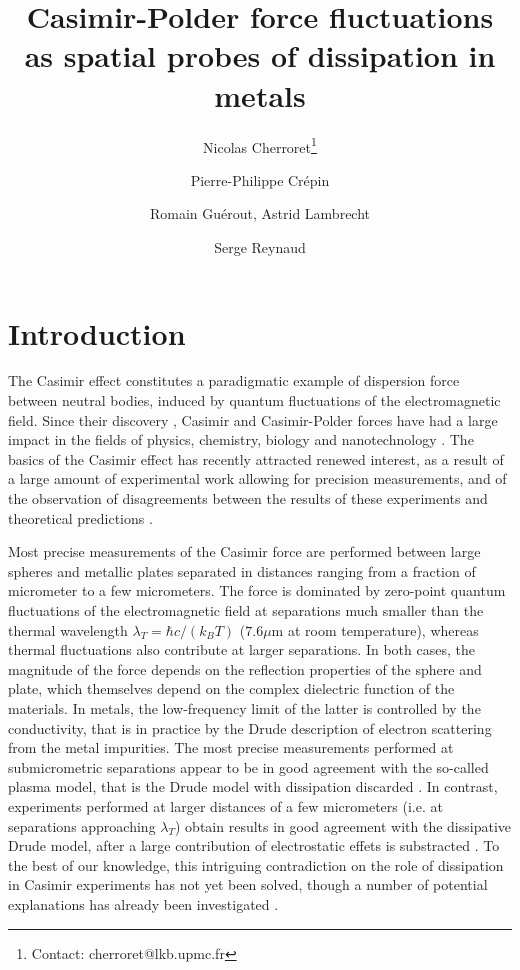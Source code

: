 \documentclass[doublecol]{epl2}
\title{Casimir-Polder force fluctuations as spatial probes of dissipation in metals}
\author{Nicolas Cherroret\footnote{Contact: cherroret@lkb.upmc.fr} \and Pierre-Philippe Cr\'epin \and Romain Gu\'erout, Astrid Lambrecht \and Serge Reynaud}
\institute{                    
Laboratoire Kastler Brossel, UPMC-Sorbonne Universit\'es, CNRS, ENS-PSL Research University, Coll\`{e}ge de France, 4 Place Jussieu, 75005 Paris, France
}
\begin{document}
\maketitle

\section{Introduction}

The Casimir effect constitutes a paradigmatic example of dispersion force between neutral bodies, induced by quantum fluctuations of the electromagnetic field. Since their discovery \cite{Casimir48, CasimirP48}, Casimir and Casimir-Polder forces have had a large impact in the fields of physics, chemistry, biology and nanotechnology \cite{Woods16,Parsegian2006, Milton2011}.
The basics of the Casimir effect has recently attracted renewed interest, as a result of a large amount of experimental work allowing for precision measurements, and of the observation of disagreements between the results of these experiments and theoretical predictions \cite{Lambrecht2011}. 

Most precise measurements of the Casimir force are performed between large spheres and metallic plates separated in distances ranging from a fraction of micrometer to a few micrometers. The force is dominated by zero-point quantum fluctuations of the electromagnetic field at separations much smaller than the thermal wavelength $\lambda_T=\hbar c/(k_B T)$ ($7.6\mu$m at room temperature), whereas thermal fluctuations also contribute at larger separations. In both cases, the magnitude of the force depends on the reflection properties of the sphere and plate, which themselves depend on the complex dielectric function of the materials. In metals, the low-frequency limit of the latter is  controlled by the conductivity, that is in practice by the Drude description of electron scattering from the metal impurities.
The most precise measurements performed at submicrometric separations appear to be in good agreement with the so-called plasma model, that is the Drude model with dissipation discarded \cite{Decca07, Chang12, Banishev13, Bimonte16}.
In contrast, experiments performed at larger distances of a few micrometers (i.e. at separations approaching $\lambda_T$) obtain results in good agreement with the dissipative Drude model, after a large contribution of electrostatic effets is substracted \cite{SushkovNatPh2011, TangPRL2012}.   To the best of our knowledge, this intriguing contradiction on the role of dissipation in Casimir experiments  has not yet been solved, though a number of potential explanations has already been investigated \cite{Reynaud2013}.
\end{document}
